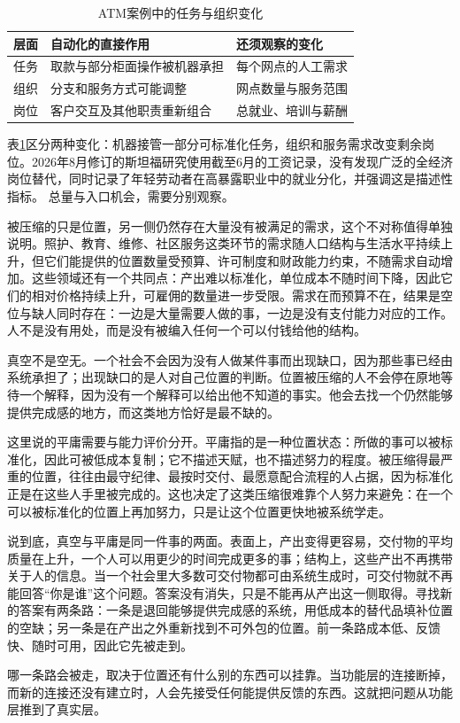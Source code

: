\begin{table}[ht]
\centering
\caption{ATM案例中的任务与组织变化}
\label{tab:ch5-atm}
{\small\begin{tabularx}{\textwidth}{@{}lXX@{}}
\toprule
层面 & 自动化的直接作用 & 还须观察的变化\\
\midrule
任务 & 取款与部分柜面操作被机器承担 & 每个网点的人工需求\\
组织 & 分支和服务方式可能调整 & 网点数量与服务范围\\
岗位 & 客户交互及其他职责重新组合 & 总就业、培训与薪酬\\
\bottomrule
\end{tabularx}}
\end{table}

表\ref{tab:ch5-atm}区分两种变化：机器接管一部分可标准化任务，组织和服务需求改变剩余岗位。2026年8月修订的斯坦福研究使用截至6月的工资记录，没有发现广泛的全经济岗位替代，同时记录了年轻劳动者在高暴露职业中的就业分化，并强调这是描述性指标。\cite{brynjolfsson2026canaries} 总量与入口机会，需要分别观察。

被压缩的只是位置，另一侧仍然存在大量没有被满足的需求，这个不对称值得单独说明。照护、教育、维修、社区服务这类环节的需求随人口结构与生活水平持续上升，但它们能提供的位置数量受预算、许可制度和财政能力约束，不随需求自动增加。这些领域还有一个共同点：产出难以标准化，单位成本不随时间下降，因此它们的相对价格持续上升，可雇佣的数量进一步受限。需求在而预算不在，结果是空位与缺人同时存在：一边是大量需要人做的事，一边是没有支付能力对应的工作。人不是没有用处，而是没有被编入任何一个可以付钱给他的结构。\cite{baumol1967macro}


真空不是空无。一个社会不会因为没有人做某件事而出现缺口，因为那些事已经由系统承担了；出现缺口的是人对自己位置的判断。位置被压缩的人不会停在原地等待一个解释，因为没有一个解释可以给出他不知道的事实。他会去找一个仍然能够提供完成感的地方，而这类地方恰好是最不缺的。

这里说的平庸需要与能力评价分开。平庸指的是一种位置状态：所做的事可以被标准化，因此可被低成本复制；它不描述天赋，也不描述努力的程度。被压缩得最严重的位置，往往由最守纪律、最按时交付、最愿意配合流程的人占据，因为标准化正是在这些人手里被完成的。这也决定了这类压缩很难靠个人努力来避免：在一个可以被标准化的位置上再加努力，只是让这个位置更快地被系统学走。

说到底，真空与平庸是同一件事的两面。表面上，产出变得更容易，交付物的平均质量在上升，一个人可以用更少的时间完成更多的事；结构上，这些产出不再携带关于人的信息。当一个社会里大多数可交付物都可由系统生成时，可交付物就不再能回答“你是谁”这个问题。答案没有消失，只是不能再从产出这一侧取得。寻找新的答案有两条路：一条是退回能够提供完成感的系统，用低成本的替代品填补位置的空缺；另一条是在产出之外重新找到不可外包的位置。前一条路成本低、反馈快、随时可用，因此它先被走到。

哪一条路会被走，取决于位置还有什么别的东西可以挂靠。当功能层的连接断掉，而新的连接还没有建立时，人会先接受任何能提供反馈的东西。这就把问题从功能层推到了真实层。

